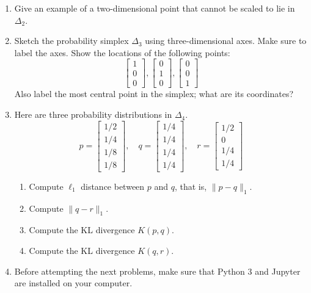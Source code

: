 \documentclass{article}
\begin{document}
\begin{enumerate}
\item Give an example of a two-dimensional point that cannot be scaled to lie in $\Delta_{2}$.

\item Sketch the probability simplex $\Delta_{3}$ using three-dimensional axes. Make sure to label the axes. Show the locations of the following points:
    \[
    \begin{bmatrix} 1 \\ 0 \\ 0 \end{bmatrix}, \begin{bmatrix} 0 \\ 1 \\ 0 \end{bmatrix}, \begin{bmatrix} 0 \\ 0 \\ 1 \end{bmatrix}
    \]
    Also label the most central point in the simplex; what are its coordinates?

\item Here are three probability distributions in $\Delta_{4}$.
    \[
    p=\begin{bmatrix} 1/2 \\ 1/4 \\ 1/8 \\ 1/8 \end{bmatrix}, \quad q=\begin{bmatrix} 1/4 \\ 1/4 \\ 1/4 \\ 1/4 \end{bmatrix}, \quad r=\begin{bmatrix} 1/2 \\ 0 \\ 1/4 \\ 1/4 \end{bmatrix}
    \]
    \begin{enumerate}
    \item Compute $\ell_{1}$ distance between $p$ and $q$, that is, $\|p-q\|_{1}$.
    \item Compute $\|q-r\|_{1}$.
    \item Compute the KL divergence $K(p, q)$.
    \item Compute the KL divergence $K(q, r)$.
    \end{enumerate}

\item Before attempting the next problems, make sure that Python 3 and Jupyter are installed on your computer.


\end{enumerate}
\end{document}
